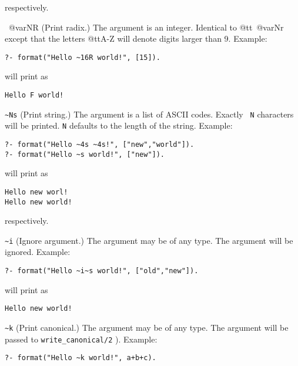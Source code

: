 \begin{description}
\begin{itemize}
{\noindent
respectively.

\item ~@var{N}R
(Print radix.) The argument is an integer.  Identical to @tt{~@var{N}r} except
that the letters @tt{A-Z} will denote digits larger than 9.  Example:  

\begin{verbatim}
?- format("Hello ~16R world!", [15]).
\end{verbatim}

\noindent
will print as

\begin{verbatim}
Hello F world!
\end{verbatim}

}

\item \verb|~Ns|
(Print string.) The argument is a list of ASCII codes.  Exactly {\tt
N} characters will be printed. {\tt N} defaults to the length of the
string.  Example:

\begin{verbatim}
?- format("Hello ~4s ~4s!", ["new","world"]).
?- format("Hello ~s world!", ["new"]).
\end{verbatim}

\noindent
will print as

\begin{verbatim}
Hello new worl!
Hello new world!
\end{verbatim}

\noindent
respectively.

\item \verb|~i|
(Ignore argument.) The argument may be of any type.  The argument will be
ignored.  Example:  

\begin{verbatim}
?- format("Hello ~i~s world!", ["old","new"]).
\end{verbatim}

\noindent
will print as

\begin{verbatim}
Hello new world!
\end{verbatim}

\item \verb|~k|
(Print canonical.) The argument may be of any type.  The argument will be
passed to {\tt write\_canonical/2} ).  Example:  

\begin{verbatim}
?- format("Hello ~k world!", a+b+c).
\end{verbatim}


\end{itemize}
\end{description}

